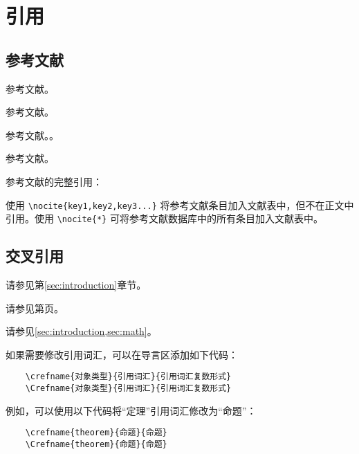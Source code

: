 \section{引用}\label{sec:reference}

\subsection{参考文献}

参考文献。\cite{MSSB201404007}

参考文献。\cite{MSSB201404007,TJLT200705022}

参考文献。\parencite{MSSB201404007}。

参考文献。

参考文献的完整引用：

使用 \verb|\nocite{key1,key2,key3...}| 将参考文献条目加入文献表中，但不在正文中引用。使用 \verb|\nocite{*}| 可将参考文献数据库中的所有条目加入文献表中。

\subsection{交叉引用}

请参见第\ref{sec:introduction}章节。

请参见第\pageref{sec:introduction}页。

请参见\cref{sec:introduction,sec:math}。

如果需要修改引用词汇，可以在导言区添加如下代码：

\begin{Verbatim}
    \crefname{对象类型}{引用词汇}{引用词汇复数形式}
    \Crefname{对象类型}{引用词汇}{引用词汇复数形式}
\end{Verbatim}

例如，可以使用以下代码将“定理”引用词汇修改为“命题”：

\begin{Verbatim}
    \crefname{theorem}{命题}{命题}
    \Crefname{theorem}{命题}{命题}
\end{Verbatim}